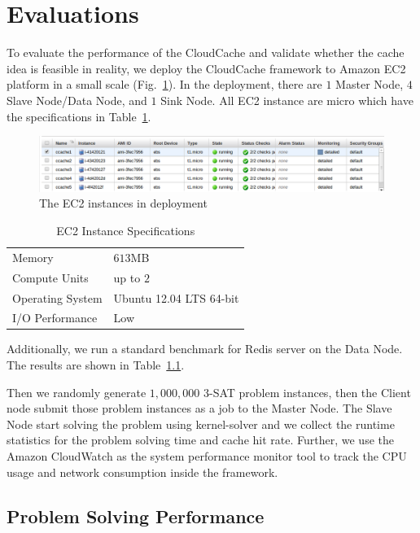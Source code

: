 \section{Evaluations} \label{sec:evaluation}
To evaluate the performance of the CloudCache and validate whether the cache idea is feasible in reality, we deploy the CloudCache framework to Amazon EC2 platform in a small scale (Fig.~\ref{fig:ec2}). In the deployment, there are $1$ Master Node, $4$ Slave Node/Data Node, and $1$ Sink Node. All EC2 instance are micro which have the specifications in Table~\ref{tab:ec2}.

\begin{figure}
\centering
\includegraphics[width=\textwidth]{pics/deployment.png}
\caption{The EC2 instances in deployment}
\label{fig:ec2}
\end{figure}

\begin{table}
\centering
\caption{EC2 Instance Specifications}
\begin{tabular}{ll}\toprule
Memory & $613$MB \\
Compute Units & up to $2$ \\
Operating System & Ubuntu 12.04 LTS 64-bit \\
I/O Performance & Low \\\bottomrule
\end{tabular}
\label{tab:ec2}
\end{table}

Additionally, we run a standard benchmark for Redis server on the Data Node. The results are shown in Table~\ref{}.

Then we randomly generate $1,000,000$ 3-SAT problem instances, then the Client node submit those problem instances as a job to the Master Node. The Slave Node start solving the problem using kernel-solver and we collect the runtime statistics for the problem solving time and cache hit rate. Further, we use the Amazon CloudWatch as the system performance monitor tool to track the CPU usage and network consumption inside the framework.

\subsection{Problem Solving Performance}

